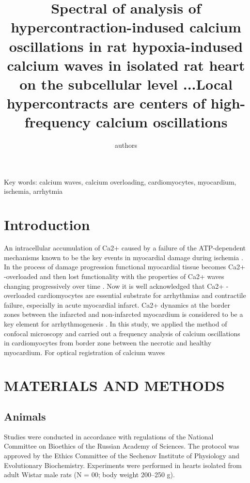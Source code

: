 \documentclass[a4paper,12pt]{article}
\title{Spectral of analysis of hypercontraction-indused calcium oscillations in rat hypoxia-indused calcium waves in isolated rat heart on the subcellular level
...Local hypercontracts are centers of high-frequency calcium oscillations}
\author{authors}
\begin{document}
\maketitle

Key words: calcium waves, calcium overloading, cardiomyocytes, myocardium, ischemia, arrhytmia

\section{Introduction}

An intracellular accumulation of Ca2+ caused by a failure of the ATP-dependent mechanisms known to be the key events in myocardial damage during ischemia \cite{shen1972myocardial,shen1972kinetics,nayler1981role}.
In the process of damage progression functional myocardial tissue becomes Ca2+ -overloaded and then lost functionality with the properties of Ca2+ waves changing progressively over time \cite{minamikawa1997situ,hama1998real}.
Now it is well acknowledged that Ca2+ -overloaded cardiomyocytes are essential substrate for arrhythmias and contractile failure, especially in acute myocardial infarct.
Ca2+ dynamics at the border zones between the infarcted and non-infarcted myocardium is considered to be a key element for arrhythmogenesis \cite{takamatsu2008arrhythmogenic}.
In this study, we applied the method of confocal microscopy and carried out a frequency analysis of calcium oscillations in cardiomyocytes from border zone between the necrotic and healthy myocardium.
For optical registration of calcium waves \cite{matsuura2018intravital}

\section{MATERIALS AND METHODS}

\subsection{Animals}

Studies were conducted in accordance with regulations of the National Committee on Bioethics of the Russian Academy of Sciences.
The protocol was approved by the Ethics Committee of the Sechenov Institute of Physiology and Evolutionary Biochemistry.
Experiments were performed in hearts isolated from adult Wistar male rats (N = 00; body weight 200–250 g).
\end{document}
